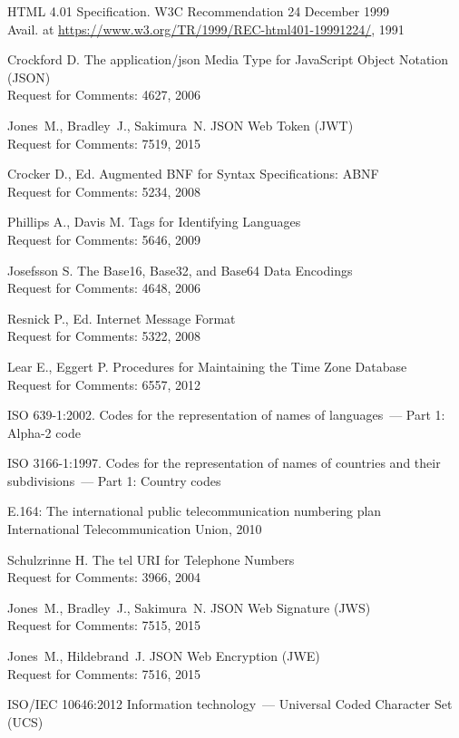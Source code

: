 \begin{thebibliography}{99}
HTML 4.01 Specification. 
W3C Recommendation 24 December 1999\\
{\small Avail. at 
\url{https://www.w3.org/TR/1999/REC-html401-19991224/}, 1991}

Crockford D.
The application/json Media Type for JavaScript Object Notation (JSON)\\
{\small Request for Comments: 4627, 2006}

Jones~M., Bradley~J., Sakimura~N. 
JSON Web Token (JWT)\\
{\small Request for Comments: 7519, 2015}

Crocker D., Ed.
Augmented BNF for Syntax Specifications: ABNF\\
{\small Request for Comments: 5234, 2008}

Phillips A., Davis M. 
Tags for Identifying Languages\\
{\small Request for Comments: 5646, 2009}

Josefsson S. 
The Base16, Base32, and Base64 Data Encodings\\
{\small Request for Comments: 4648, 2006}

Resnick P., Ed. 
Internet Message Format\\
{\small Request for Comments: 5322, 2008}

Lear E., Eggert P.
Procedures for Maintaining the Time Zone Database\\
{\small Request for Comments: 6557, 2012}

ISO 639-1:2002. Codes for the representation of names of languages~---
Part 1: Alpha-2 code

ISO 3166-1:1997. Codes for the representation of names of
countries and their subdivisions~--- Part 1: Country codes

E.164: The international public telecommunication numbering plan\\
{\small International Telecommunication Union, 2010}

Schulzrinne H. 
The tel URI for Telephone Numbers\\
{\small Request for Comments: 3966, 2004}

Jones~M., Bradley~J., Sakimura~N. 
JSON Web Signature (JWS)\\
{\small Request for Comments: 7515, 2015}

Jones~M., Hildebrand~J. 
JSON Web Encryption (JWE)\\
{\small Request for Comments: 7516, 2015}

ISO/IEC 10646:2012 Information technology~--- Universal Coded Character 
Set (UCS)

\end{thebibliography}
